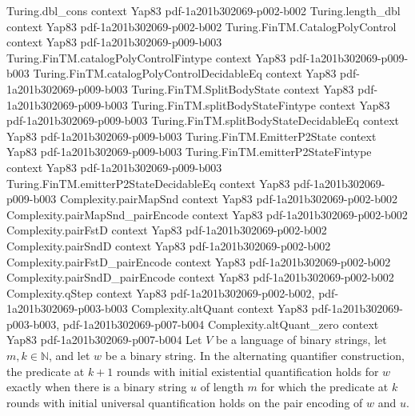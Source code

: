 \begin{theorem}
\proofstep
  {Turing.dbl_cons}
  {context}
  {Yap83}
  {pdf-1a201b302069-p002-b002}
\proofstep
  {Turing.length_dbl}
  {context}
  {Yap83}
  {pdf-1a201b302069-p002-b002}
\proofstep
  {Turing.FinTM.CatalogPolyControl}
  {context}
  {Yap83}
  {pdf-1a201b302069-p009-b003}
\proofstep
  {Turing.FinTM.catalogPolyControlFintype}
  {context}
  {Yap83}
  {pdf-1a201b302069-p009-b003}
\proofstep
  {Turing.FinTM.catalogPolyControlDecidableEq}
  {context}
  {Yap83}
  {pdf-1a201b302069-p009-b003}
\proofstep
  {Turing.FinTM.SplitBodyState}
  {context}
  {Yap83}
  {pdf-1a201b302069-p009-b003}
\proofstep
  {Turing.FinTM.splitBodyStateFintype}
  {context}
  {Yap83}
  {pdf-1a201b302069-p009-b003}
\proofstep
  {Turing.FinTM.splitBodyStateDecidableEq}
  {context}
  {Yap83}
  {pdf-1a201b302069-p009-b003}
\proofstep
  {Turing.FinTM.EmitterP2State}
  {context}
  {Yap83}
  {pdf-1a201b302069-p009-b003}
\proofstep
  {Turing.FinTM.emitterP2StateFintype}
  {context}
  {Yap83}
  {pdf-1a201b302069-p009-b003}
\proofstep
  {Turing.FinTM.emitterP2StateDecidableEq}
  {context}
  {Yap83}
  {pdf-1a201b302069-p009-b003}
\proofstep
  {Complexity.pairMapSnd}
  {context}
  {Yap83}
  {pdf-1a201b302069-p002-b002}
\proofstep
  {Complexity.pairMapSnd_pairEncode}
  {context}
  {Yap83}
  {pdf-1a201b302069-p002-b002}
\proofstep
  {Complexity.pairFstD}
  {context}
  {Yap83}
  {pdf-1a201b302069-p002-b002}
\proofstep
  {Complexity.pairSndD}
  {context}
  {Yap83}
  {pdf-1a201b302069-p002-b002}
\proofstep
  {Complexity.pairFstD_pairEncode}
  {context}
  {Yap83}
  {pdf-1a201b302069-p002-b002}
\proofstep
  {Complexity.pairSndD_pairEncode}
  {context}
  {Yap83}
  {pdf-1a201b302069-p002-b002}
\proofstep
  {Complexity.qStep}
  {context}
  {Yap83}
  {pdf-1a201b302069-p002-b002,
    pdf-1a201b302069-p003-b003}
\proofstep
  {Complexity.altQuant}
  {context}
  {Yap83}
  {pdf-1a201b302069-p003-b003,
    pdf-1a201b302069-p007-b004}
\proofstep
  {Complexity.altQuant_zero}
  {context}
  {Yap83}
  {pdf-1a201b302069-p007-b004}
Let $V$ be a language of binary strings, let $m,k\in\mathbb{N}$, and let $w$ be a binary
string. In the alternating quantifier construction, the predicate at $k+1$ rounds with
initial existential quantification holds for $w$ exactly when there is a binary string
$u$ of length $m$ for which the predicate at $k$ rounds with initial universal
quantification holds on the pair encoding of $w$ and $u$.
\end{theorem}

